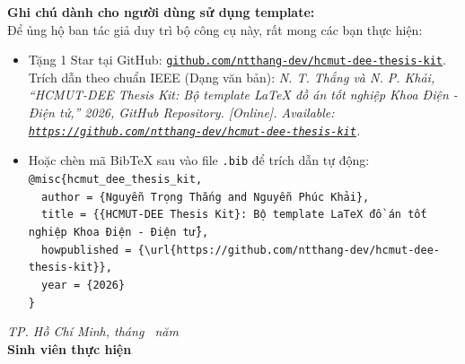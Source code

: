 \begin{singlespace}
  \vspace{0.1cm}
  \noindent
  \begin{tcolorbox}[colback=blue!5, colframe=blue!40, arc=4pt, boxrule=0.5pt, left=10pt, right=10pt, top=5pt, bottom=5pt]
    \fontsize{8.5}{11}\selectfont
    \textbf{ Ghi chú dành cho người dùng sử dụng template:} \\
    Để ủng hộ ban tác giả duy trì bộ công cụ này, rất mong các bạn thực hiện:
    \begin{itemize}[nosep, leftmargin=1.2em, topsep=2pt]
      \item Tặng 1 Star tại GitHub: \href{https://github.com/ntthang-dev/hcmut-dee-thesis-kit}{\texttt{github.com/ntthang-dev/hcmut-dee-thesis-kit}}.
       Trích dẫn theo chuẩn IEEE (Dạng văn bản):
       \textit{N. T. Thắng và N. P. Khải, ``HCMUT-DEE Thesis Kit: Bộ template LaTeX đồ án tốt nghiệp Khoa Điện - Điện tử,'' 2026, GitHub Repository. [Online]. Available: \href{https://github.com/ntthang-dev/hcmut-dee-thesis-kit}{\texttt{https://github.com/ntthang-dev/hcmut-dee-thesis-kit}}.}
       
      \item Hoặc chèn mã BibTeX sau vào file \texttt{.bib} để trích dẫn tự động: \\
        \fontsize{8}{9.5}\selectfont
        \texttt{@misc\{hcmut\_dee\_thesis\_kit,}\\
        \texttt{~~author = \{Nguyễn Trọng Thắng and Nguyễn Phúc Khải\},}\\
        \texttt{~~title = \{\{HCMUT-DEE Thesis Kit\}: Bộ template LaTeX đồ án tốt nghiệp Khoa Điện - Điện tử\},}\\
        \texttt{~~howpublished = \{\textbackslash url\{https://github.com/ntthang-dev/hcmut-dee-thesis-kit\}\},}\\
        \texttt{~~year = \{2026\}}\\
        \texttt{\}}
    \end{itemize}
  \end{tcolorbox}
\end{singlespace}
 
\vspace{0.15cm}
\begin{flushright}
  \textit{TP. Hồ Chí Minh, tháng \getThesisMonth\ năm \getThesisYear} \\
  \vspace{0.15cm}
  \textbf{Sinh viên thực hiện} \\
  \vspace{0.8cm}
  \textbf{\getStudentName}
\end{flushright}
